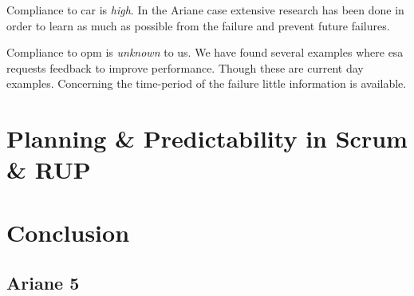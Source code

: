 Compliance to \ac{car} is \textit{high}. In the Ariane case extensive research has been done in order to learn as much as possible from the failure and prevent future failures. 

Compliance to \ac{opm} is \textit{unknown} to us. We have found several examples where \ac{esa} requests feedback to improve performance. Though these are current day examples. Concerning the time-period of the failure little information is available.

\section{Planning \& Predictability in Scrum \& RUP}

\section{Conclusion}
\subsection{Ariane 5}
